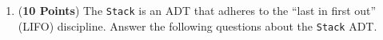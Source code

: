 \documentclass[12pt]{article}
\begin{document}
\begin{enumerate}
\begin{enumerate}

\end{enumerate}

\newpage

\item ({\bf 10 Points}) The {\tt Stack} is an ADT that adheres to the
  ``last in first out'' (LIFO) discipline.  Answer the following
  questions about the {\tt Stack} ADT.

  \begin{enumerate}





\end{enumerate}
\end{enumerate}
\end{document}
